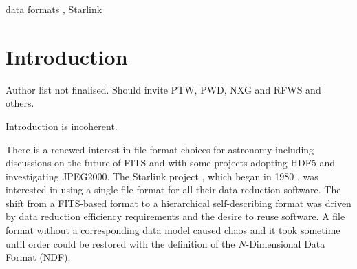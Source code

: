 \documentclass[final,authoryear,5p,times,twocolumn]{elsarticle}
\begin{document}
\begin{frontmatter}
\begin{abstract}
\end{abstract}

\begin{keyword}


data formats \sep
Starlink

\end{keyword}

\end{frontmatter}


\newcommand{\mnras}{Mon Not R Astron Soc}
\newcommand{\aap}{Astron Astrophys}
\newcommand{\aaps}{Astron Astrophys Supp}
\newcommand{\pasp}{Pub Astron Soc Pacific}
\newcommand{\apj}{Astrophys J}
\newcommand{\apjs}{Astrophys J Supp}
\newcommand{\qjras}{Quart J R Astron Soc}
\newcommand{\an}{Astron.\ Nach.}
\newcommand{\ijimw}{Int.\ J.\ Infrared \& Millimeter Waves}
\newcommand{\procspie}{Proc.\ SPIE}
\newcommand{\aspconf}{ASP Conf. Ser.}



\section{Introduction}
\label{sec:intro}

{\color{red} Author list not finalised. Should invite PTW, PWD, NXG
  and RFWS and others.}

{\color{red} Introduction is incoherent.}

There is a renewed interest in file format choices for astronomy
including discussions on the future of FITS \citep{P90_adassxxiii} and
with some projects adopting HDF5 and investigating JPEG2000. The
Starlink project \citep{2000ASSL..250...93W,2002A&G....43a..25P},
which began in 1980 \citep{1982MmSAI..53...55T}, was interested in
using a single file format for all their data reduction software. The
shift from a FITS-based format to a hierarchical self-describing
format was driven by data reduction efficiency requirements and the
desire to reuse software. A file format without a corresponding data
model caused chaos and it took sometime until order could be restored
with the definition of the $N$-Dimensional Data Format (NDF).
\end{document}
